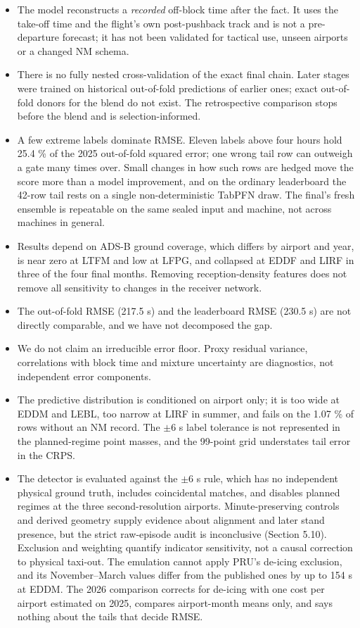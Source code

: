 \documentclass[
  manuscript=article,  %
  layout=preprint,     %
  year=2026,
  volume=4,
]{extra/joas}
\providecommand{\tightlist}{\setlength{\itemsep}{0pt}\setlength{\parskip}{0pt}}
\begin{document}
\begin{itemize}
\tightlist
\item
  The model reconstructs a \emph{recorded} off-block time after the fact. It uses the take-off time and the flight's own post-pushback track and is not a pre-departure forecast; it has not been validated for tactical use, unseen airports or a changed NM schema.
\item
  There is no fully nested cross-validation of the exact final chain. Later stages were trained on historical out-of-fold predictions of earlier ones; exact out-of-fold donors for the blend do not exist. The retrospective comparison stops before the blend and is selection-informed.
\item
  A few extreme labels dominate RMSE. Eleven labels above four hours hold 25.4 \% of the 2025 out-of-fold squared error; one wrong tail row can outweigh a gate many times over. Small changes in how such rows are hedged move the score more than a model improvement, and on the ordinary leaderboard the 42-row tail rests on a single non-deterministic TabPFN draw. The final's fresh ensemble is repeatable on the same sealed input and machine, not across machines in general.
\item
  Results depend on ADS-B ground coverage, which differs by airport and year, is near zero at LTFM and low at LFPG, and collapsed at EDDF and LIRF in three of the four final months. Removing reception-density features does not remove all sensitivity to changes in the receiver network.
\item
  The out-of-fold RMSE (217.5 s) and the leaderboard RMSE (230.5 s) are not directly comparable, and we have not decomposed the gap.
\item
  We do not claim an irreducible error floor. Proxy residual variance, correlations with block time and mixture uncertainty are diagnostics, not independent error components.
\item
  The predictive distribution is conditioned on airport only; it is too wide at EDDM and LEBL, too narrow at LIRF in summer, and fails on the 1.07 \% of rows without an NM record. The $\pm$6 s label tolerance is not represented in the planned-regime point masses, and the 99-point grid understates tail error in the CRPS.
\item
  The detector is evaluated against the $\pm$6 s rule, which has no independent physical ground truth, includes coincidental matches, and disables planned regimes at the three second-resolution airports. Minute-preserving controls and derived geometry supply evidence about alignment and later stand presence, but the strict raw-episode audit is inconclusive (Section 5.10). Exclusion and weighting quantify indicator sensitivity, not a causal correction to physical taxi-out. The emulation cannot apply PRU's de-icing exclusion, and its November--March values differ from the published ones by up to 154 s at EDDM. The 2026 comparison corrects for de-icing with one cost per airport estimated on 2025, compares airport-month means only, and says nothing about the tails that decide RMSE.

\end{itemize}
\end{document}
